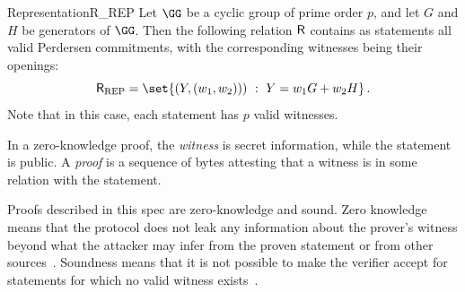\documentclass[11pt]{article}
\begin{document}
\begin{example}{Representation}{R_REP}
  Let $\GG$ be a cyclic group of prime order $p$, and let $G$ and $H$ be generators of $\GG$.
	Then the following relation $\mathsf{R}$ contains as statements all valid Perdersen commitments, with the corresponding witnesses being their openings:
  $$
	  \relation_{\operatorname{REP}} = \set{\left(\statement,(\witness_1,\witness_2))\right)~:~\statement=\witness_1G + \witness_2H}\,.
	$$
	Note that in this case, each statement has $p$ valid witnesses.
\end{example}

In a zero-knowledge proof, the \emph{witness} is secret information, while the statement is public.
A \emph{proof} is a sequence of bytes attesting that a witness is in some relation with the statement.

Proofs described in this spec are zero-knowledge and sound.
Zero knowledge means that the protocol does not leak any information about the prover's witness beyond what the attacker may infer from the proven statement or from other sources~\cite[1.6.4]{zkproof-reference}.
Soundness means that it is not possible to make the verifier accept for statements for which no valid witness exists~\cite[1.6.2]{zkproof-reference}.


\end{document}
